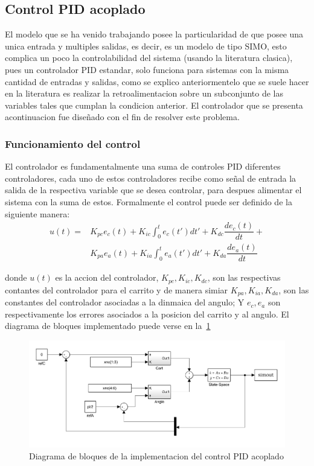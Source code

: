 \subsection{Control PID acoplado}
El modelo que se ha venido trabajando posee la particularidad de que posee una unica entrada
y multiples salidas, es decir, es un modelo de tipo SIMO, esto complica un poco la
controlabilidad del sistema (usando la literatura clasica), pues un controlador PID estandar,
solo funciona para sistemas con la misma cantidad de entradas y salidas, como se explico
anteriormentelo que se suele hacer en la literatura es realizar la retroalimentacion sobre
un subconjunto de las variables tales que cumplan la condicion anterior.
El controlador que se presenta acontinuacion fue diseñado con el fin de resolver este
problema.
\subsubsection{Funcionamiento del control}
El controlador es fundamentalmente una suma de controles PID diferentes controladores,
cada uno de estos controladores recibe como señal de entrada la salida de la respectiva
variable que se desea controlar, para despues alimentar el sistema con la suma de estos.
Formalmente el control puede ser definido de la siguiente manera:
\begin{align*}
  u(t) =& K_{pc}e_c(t) + K_{ic}\int_0^te_c(t')dt' + K_{dc}\dfrac{de_{c}(t)}{dt} + \\
   & K_{pa}e_a(t) + K_{ia}\int_0^te_a(t')dt' + K_{da}\dfrac{de_{a}(t)}{dt}  
\end{align*}

donde $u(t)$ es la accion del controlador, $K_{pc}, K_{ic}, K_{dc}$, son las respectivas
contantes del controlador para el carrito y de manera simiar $K_{pa}, K_{ia}, K_{da}$,
son las constantes del controlador asociadas a la dinmaica del angulo; Y $e_c, e_a$ son
respectivamente los errores asociados a la posicion del carrito y al angulo.
El diagrama de bloques implementado puede verse en la~\ref{fig:controlS}

\begin{figure}[t]
  \label{fig:controlS}
  \includegraphics[scale=1]{Figuras/control-modelo.jpg}
  \caption{Diagrama de bloques de la implementacion del control PID acoplado} 
\end{figure}

